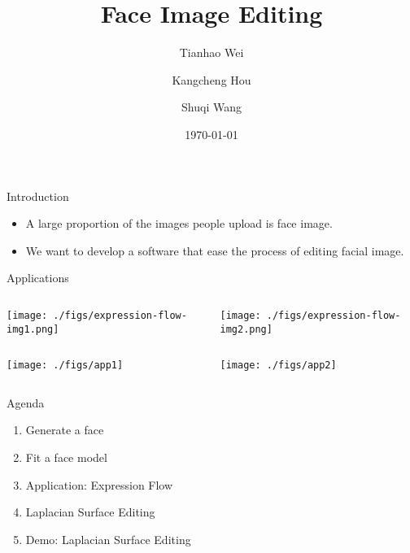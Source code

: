 \documentclass{beamer}
\title{Face Image Editing}
\author{Tianhao Wei \and Kangcheng Hou \and Shuqi Wang}
\date{\today}
\begin{document}
    
\frame{\titlepage}

\begin{frame}{Introduction}
\begin{itemize}
\item A large proportion of the images people upload is face image.
\item We want to develop a software that ease the process of editing facial image.
\end{itemize}
\end{frame}
\begin{frame}[allowframebreaks]{Applications}
\begin{columns}
\begin{column}{0.5\textwidth}\texttt{[image: ./figs/expression-flow-img1.png]}\end{column}
\begin{column}{0.5\textwidth}\texttt{[image: ./figs/expression-flow-img2.png]}\end{column}
\end{columns}
\framebreak
\begin{columns}
\begin{column}{0.5\textwidth}\texttt{[image: ./figs/app1]}\end{column}
\begin{column}{0.5\textwidth}\texttt{[image: ./figs/app2]}\end{column}
\end{columns}
\end{frame}
\begin{frame}{Agenda}
\begin{enumerate}
\item Generate a face
\item Fit a face model
\item Application: Expression Flow
\item Laplacian Surface Editing
\item Demo: Laplacian Surface Editing
\end{enumerate}
\end{frame}
\end{document}
